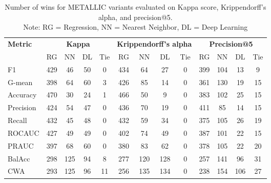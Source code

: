 \documentclass{article}
\begin{document}
\begin{sidewaystable}[htbp]
\centering
\captionsetup{justification=centering}
\caption{Number of wins for METALLIC variants evaluated on Kappa score, Krippendorff's alpha, and precision@5.\\\small{Note: RG = Regression, NN = Nearest Neighbor, DL = Deep Learning}}\label{tab:metallic_wins}
\begin{tabular}{lcccccccccccc}
\toprule
\multirow{1}{*}{\textbf{Metric}} & \multicolumn{4}{c}{\textbf{Kappa}} & \multicolumn{4}{c}{\textbf{Krippendorff's alpha}} & \multicolumn{4}{c}{\textbf{Precision@5}} \\
 & RG & NN & DL & Tie & RG & NN & DL & Tie & RG & NN & DL & Tie \\
\midrule
F1 & 429 & 46 & 50 & 0 & 434 & 64 & 27 & 0 & 399 & 104 & 13 & 9 \\
G-mean & 398 & 64 & 60 & 3 & 426 & 85 & 14 & 0 & 361 & 130 & 19 & 15 \\
Accuracy & 470 & 30 & 24 & 1 & 466 & 50 & 9 & 0 & 383 & 102 & 25 & 15 \\
Precision & 424 & 54 & 47 & 0 & 436 & 70 & 19 & 0 & 411 & 85 & 14 & 15 \\
Recall & 432 & 45 & 48 & 0 & 432 & 59 & 34 & 0 & 375 & 105 & 26 & 19 \\
ROCAUC & 427 & 49 & 49 & 0 & 402 & 74 & 49 & 0 & 387 & 101 & 22 & 15 \\
PRAUC & 397 & 68 & 60 & 0 & 380 & 83 & 62 & 0 & 378 & 105 & 22 & 20 \\
BalAcc & 298 & 125 & 94 & 8 & 277 & 120 & 128 & 0 & 257 & 141 & 96 & 31 \\
CWA & 293 & 125 & 96 & 11 & 256 & 135 & 134 & 0 & 238 & 154 & 106 & 27 \\
\bottomrule
\end{tabular}
\end{sidewaystable}
\end{document}
